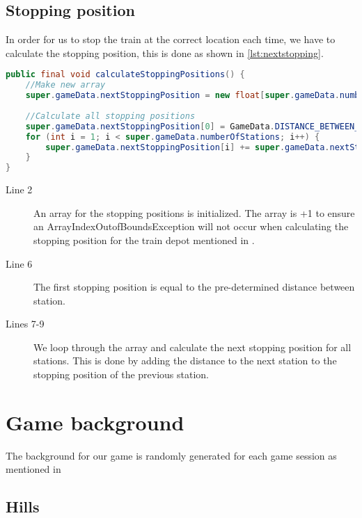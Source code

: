 \subsection{Stopping position}

In order for us to stop the train at the correct location each time, we have to calculate the stopping position, this is done as shown in \autoref{lst:nextstopping}.

\begin{lstlisting}[language=java,firstnumber=1,caption={Calculating the next stopping position.},label=lst:nextstopping]
public final void calculateStoppingPositions() {        
    //Make new array
    super.gameData.nextStoppingPosition = new float[super.gameData.numberOfStations + 1];
    
    //Calculate all stopping positions
    super.gameData.nextStoppingPosition[0] = GameData.DISTANCE_BETWEEN_STATIONS;
    for (int i = 1; i < super.gameData.numberOfStations; i++) {
        super.gameData.nextStoppingPosition[i] += super.gameData.nextStoppingPosition[i-1] + GameData.DISTANCE_BETWEEN_STATIONS;
    }
}
\end{lstlisting}

\begin{description}
\item[Line 2] An array for the stopping positions is initialized. The array is +1 to ensure an ArrayIndexOutofBoundsException will not occur when calculating the stopping position for the train depot mentioned in .
\item[Line 6] The first stopping position is equal to the pre-determined distance between station. 
\item[Lines 7-9] We loop through the array and calculate the next stopping position for all stations. This is done by adding the distance to the next station to the stopping position of the previous station.
\end{description}

\section{Game background}

The background for our game is randomly generated for each game session as mentioned in 

\subsection{Hills}

